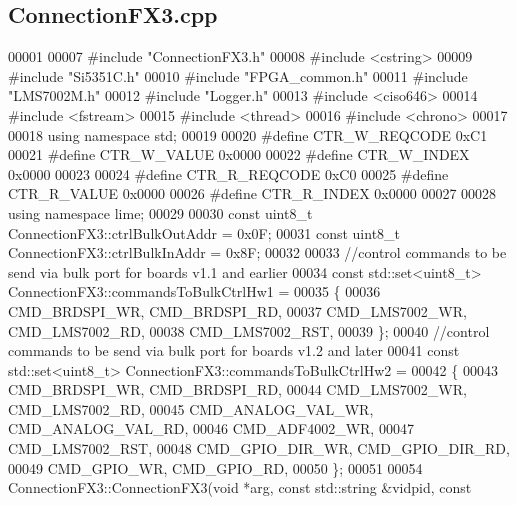 \subsection{Connection\+F\+X3.\+cpp}
\label{ConnectionFX3_8cpp_source}

\begin{DoxyCode}
00001 
00007 \textcolor{preprocessor}{#include "ConnectionFX3.h"}
00008 \textcolor{preprocessor}{#include <cstring>}
00009 \textcolor{preprocessor}{#include "Si5351C.h"}
00010 \textcolor{preprocessor}{#include "FPGA_common.h"}
00011 \textcolor{preprocessor}{#include "LMS7002M.h"}
00012 \textcolor{preprocessor}{#include "Logger.h"}
00013 \textcolor{preprocessor}{#include <ciso646>}
00014 \textcolor{preprocessor}{#include <fstream>}
00015 \textcolor{preprocessor}{#include <thread>}
00016 \textcolor{preprocessor}{#include <chrono>}
00017 
00018 \textcolor{keyword}{using namespace }std;
00019 
00020 \textcolor{preprocessor}{#define CTR\_W\_REQCODE 0xC1}
00021 \textcolor{preprocessor}{#define CTR\_W\_VALUE 0x0000}
00022 \textcolor{preprocessor}{#define CTR\_W\_INDEX 0x0000}
00023 
00024 \textcolor{preprocessor}{#define CTR\_R\_REQCODE 0xC0}
00025 \textcolor{preprocessor}{#define CTR\_R\_VALUE 0x0000}
00026 \textcolor{preprocessor}{#define CTR\_R\_INDEX 0x0000}
00027 
00028 \textcolor{keyword}{using namespace }lime;
00029 
00030 \textcolor{keyword}{const} uint8\_t ConnectionFX3::ctrlBulkOutAddr = 0x0F;
00031 \textcolor{keyword}{const} uint8\_t ConnectionFX3::ctrlBulkInAddr = 0x8F;
00032 
00033 \textcolor{comment}{//control commands to be send via bulk port for boards v1.1 and earlier}
00034 \textcolor{keyword}{const} std::set<uint8\_t> ConnectionFX3::commandsToBulkCtrlHw1 =
00035 \{
00036     CMD_BRDSPI_WR, CMD_BRDSPI_RD,
00037     CMD_LMS7002_WR, CMD_LMS7002_RD,
00038     CMD_LMS7002_RST,
00039 \};
00040 \textcolor{comment}{//control commands to be send via bulk port for boards v1.2 and later}
00041 \textcolor{keyword}{const} std::set<uint8\_t> ConnectionFX3::commandsToBulkCtrlHw2 =
00042 \{
00043     CMD_BRDSPI_WR, CMD_BRDSPI_RD,
00044     CMD_LMS7002_WR, CMD_LMS7002_RD,
00045     CMD_ANALOG_VAL_WR, CMD_ANALOG_VAL_RD,
00046     CMD_ADF4002_WR,
00047     CMD_LMS7002_RST,
00048     CMD_GPIO_DIR_WR, CMD_GPIO_DIR_RD,
00049     CMD_GPIO_WR, CMD_GPIO_RD,
00050 \};
00051 
00054 ConnectionFX3::ConnectionFX3(\textcolor{keywordtype}{void} *arg, \textcolor{keyword}{const} std::string &vidpid, \textcolor{keyword}{const} 

\end{DoxyCode}
